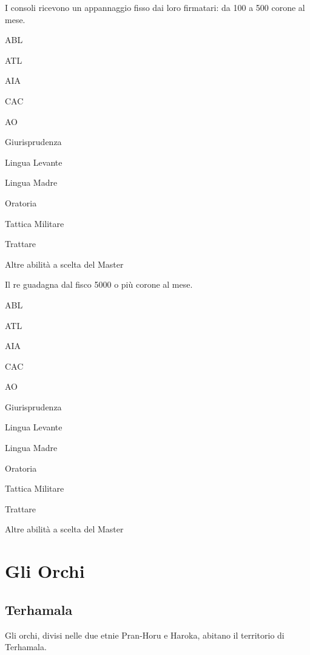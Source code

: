 
I consoli ricevono un appannaggio fisso dai loro firmatari: da 100 a
500 corone al mese.

\begin{abilist}
\item ABL
\item ATL
\item AIA
\item CAC
\item AO
\item Giurisprudenza
\item Lingua Levante
\item Lingua Madre
\item Oratoria
\item Tattica Militare
\item Trattare
\item Altre abilit\`a a scelta del Master
\end{abilist}


Il re guadagna dal fisco 5000 o pi\`u corone al mese.

\begin{abilist}
\item ABL
\item ATL
\item AIA
\item CAC
\item AO
\item Giurisprudenza
\item Lingua Levante
\item Lingua Madre
\item Oratoria
\item Tattica Militare
\item Trattare
\item Altre abilit\`a a scelta del Master
\end{abilist}


\section{Gli Orchi}

\subsection{Terhamala}


Gli orchi, divisi nelle due etnie Pran-Horu e Haroka, abitano il
territorio di Terhamala.

